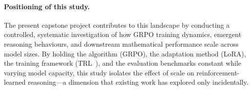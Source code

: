 \documentclass[12pt,a4paper]{report}
\begin{document}
\paragraph{Positioning of this study.} The present capstone project contributes to this landscape by conducting a controlled, systematic investigation of how GRPO training dynamics, emergent reasoning behaviours, and downstream mathematical performance scale across model sizes. By holding the algorithm (GRPO), the adaptation method (LoRA), the training framework (TRL~\cite{vonwerra2022trl}), and the evaluation benchmarks constant while varying model capacity, this study isolates the effect of scale on reinforcement-learned reasoning---a dimension that existing work has explored only incidentally.



\end{document}
